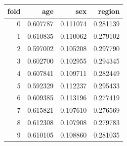 \begin{tabular}{rrrr}
\toprule
fold & age & sex & region \\
\midrule
0 & 0.607787 & 0.111074 & 0.281139 \\
1 & 0.610835 & 0.110062 & 0.279102 \\
2 & 0.597002 & 0.105208 & 0.297790 \\
3 & 0.602700 & 0.102955 & 0.294345 \\
4 & 0.607841 & 0.109711 & 0.282449 \\
5 & 0.592329 & 0.112237 & 0.295433 \\
6 & 0.609385 & 0.113196 & 0.277419 \\
7 & 0.615821 & 0.107610 & 0.276569 \\
8 & 0.612308 & 0.107908 & 0.279783 \\
9 & 0.610105 & 0.108860 & 0.281035 \\
\bottomrule
\end{tabular}
